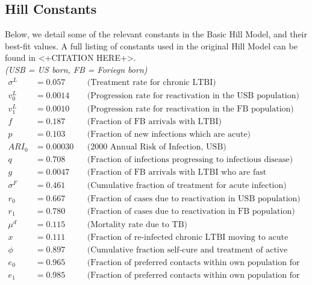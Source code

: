\documentclass{amsart}
\begin{document}
\subsection{Hill Constants}
Below, we detail some of the relevant constants in the Basic Hill Model, and
their best-fit values. A full listing of constants used in the original Hill
Model can be found in <+CITATION HERE+>. \\
\textit{(USB = US born, FB = Foriegn born)}
\begin{align*}
  \sigma^{L} &= 0.057   &&\text{(Treatment rate for chronic LTBI)}\\
  v^{L}_{0}  &= 0.0014  &&\text{(Progression rate for reactivation in the USB
                                 population)}\\
  v^{L}_{1}  &= 0.0010  &&\text{(Progression rate for reactivation in the FB
                                 population)}\\
  f          &= 0.187   &&\text{(Fraction of FB arrivals with LTBI)}\\
  p          &= 0.103   &&\text{(Fraction of new infections which are acute)}\\
  ARI_{0}    &= 0.00030 &&\text{(2000 Annual Risk of Infection, USB)}\\
  q          &= 0.708   &&\text{(Fraction of infections progressing to infectious
                                 disease)}\\
  g          &= 0.0047  &&\text{(Fraction of FB arrivals with LTBI who are fast
                                 progressors)}\\
  \sigma^{F} &= 0.461   &&\text{(Cumulative fraction of treatment for acute
                                 infection)}\\
  r_{0}      &= 0.667   &&\text{(Fraction of cases due to reactivation in USB
                                 population)}\\
  r_{1}      &= 0.780   &&\text{(Fraction of cases due to reactivation in FB
                                 population)}\\
  \mu^{d}    &= 0.115   &&\text{(Mortality rate due to TB)}\\
  x          &= 0.111   &&\text{(Fraction of re-infected chronic LTBI moving to
                                 acute infection)}\\
  \phi       &= 0.897   &&\text{(Cumulative fraction self-cure and treatment of
                                 active disease)}\\
  e_{0}      &= 0.965   &&\text{(Fraction of preferred contacts within own
                                 population for USB)}\\
  e_{1}      &= 0.985   &&\text{(Fraction of preferred contacts within own
                                population for FB)}\\
\end{align*}
\end{document}
